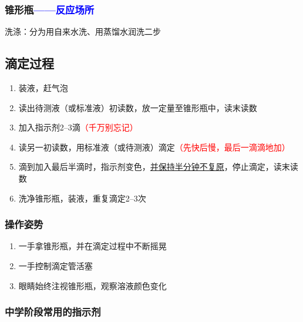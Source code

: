        \subsubsection{锥形瓶\texorpdfstring{\textcolor{blue}{——反应场所}}{}}\label{subsubsec:锥形瓶}
            洗涤：分为用自来水洗、用蒸馏水润洗二步

    \subsection{滴定过程}\label{subsec:滴定过程}

        \begin{enumerate}
            \item 装液，赶气泡
            \item 读出待测液（或标准液）初读数，放一定量至锥形瓶中，读末读数
            \item 加入指示剂\numrange{2}{3}滴\textcolor{red}{（千万别忘记）}
            \item 读另一初读数，用标准液（或待测液）滴定\textcolor{red}{（先快后慢，最后一滴滴地加）}
            \item 滴到加入最后半滴时，指示剂变色，\uline{并保持半分钟不复原}，停止滴定，读末读数
            \item 洗净锥形瓶，装液，重复滴定\numrange{2}{3}次
        \end{enumerate}

        \subsubsection{操作姿势}\label{subsubsec:滴定操作姿势}

        \begin{enumerate}
            \item 一手拿锥形瓶，并在滴定过程中不断摇晃
            \item 一手控制滴定管活塞
            \item 眼睛始终注视锥形瓶，观察溶液颜色变化
        \end{enumerate}

        \subsubsection{中学阶段常用的指示剂}\label{subsubsec:滴定中学阶段常用的指示剂}

